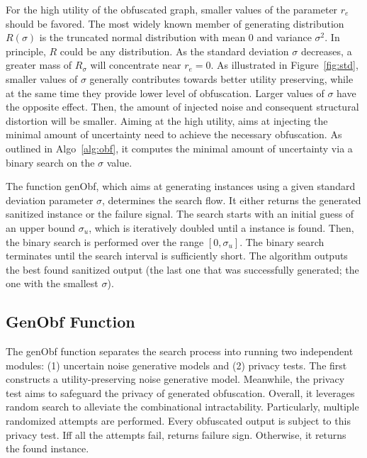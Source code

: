 For the high utility of the obfuscated graph, smaller values of the parameter $r_{e}$ should be favored.  
The most widely known member of generating distribution $R({\sigma})$ is the truncated normal distribution with mean 0 and variance $\sigma^2$. 
In principle, $R$ could be any distribution.
As the standard deviation $\sigma$ decreases, a greater mass of $R_{\sigma}$ will concentrate near $r_{e}=0$.  
As illustrated in Figure~\ref{fig:std}, smaller values of $\sigma$ generally contributes towards better utility preserving, while at the same time they provide lower level of obfuscation. 
Larger values of $\sigma$ have the opposite effect.
Then, the amount of injected noise and consequent structural distortion will be smaller. 
Aiming at the high utility, {\soaName} aims at injecting the minimal amount of uncertainty need to achieve the necessary obfuscation. 
As outlined in Algo~\ref{alg:obf}, it computes the minimal amount of uncertainty via a binary search on the $\sigma$ value. 


The function genObf, which aims at generating {\keobf} instances using a given standard deviation parameter $\sigma$, determines the search flow. It either returns the generated sanitized instance or the failure signal.
The search starts with an initial guess of an upper bound $\sigma_{u}$, which is iteratively doubled until a {\keobf} instance is found. Then, the binary search is performed over the range $[0,\sigma_{u}]$. The binary search terminates until the search interval is sufficiently short. The algorithm outputs the best found sanitized output  (the last one that was successfully generated; the one with the smallest $\sigma$).

\subsection{GenObf Function}
The genObf function separates the search process into running two independent modules: (1) uncertain noise generative models and (2) privacy tests. 
The first constructs a utility-preserving noise generative model. 
Meanwhile, the privacy test aims to safeguard the privacy of generated obfuscation. 
Overall, it leverages random search to alleviate the combinational intractability.  
Particularly, multiple randomized attempts are performed. 
Every obfuscated output is subject to this privacy test. 
Iff all the attempts fail, {\genobf} returns failure sign. Otherwise, it returns the found {\keobf} instance.

